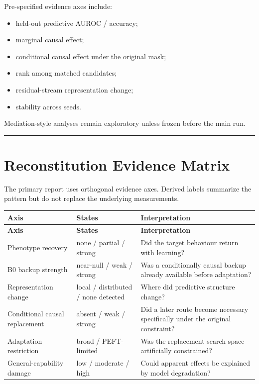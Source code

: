Pre-specified evidence axes include:

\begin{itemize}
\tightlist
\item held-out predictive AUROC / accuracy;
\item marginal causal effect;
\item conditional causal effect under the original mask;
\item rank among matched candidates;
\item residual-stream representation change;
\item stability across seeds.
\end{itemize}

Mediation-style analyses remain exploratory unless frozen before the main run.

\begin{center}\rule{0.5\linewidth}{0.5pt}\end{center}



\section{Reconstitution Evidence Matrix}\label{reconstitution-decision-table}

The primary report uses orthogonal evidence axes. Derived labels summarize the pattern but do not replace the underlying measurements.

\begin{longtable}{@{}p{}p{}p{}@{}}
\toprule
\textbf{Axis} & \textbf{States} & \textbf{Interpretation} \\
\midrule
\endfirsthead
\toprule
\textbf{Axis} & \textbf{States} & \textbf{Interpretation} \\
\midrule
\endhead
Phenotype recovery & none / partial / strong & Did the target behaviour return with learning? \\
B0 backup strength & near-null / weak / strong & Was a conditionally causal backup already available before adaptation? \\
Representation change & local / distributed / none detected & Where did predictive structure change? \\
Conditional causal replacement & absent / weak / strong & Did a later route become necessary specifically under the original constraint? \\
Adaptation restriction & broad / PEFT-limited & Was the replacement search space artificially constrained? \\
General-capability damage & low / moderate / high & Could apparent effects be explained by model degradation? \\
\bottomrule
\end{longtable}

